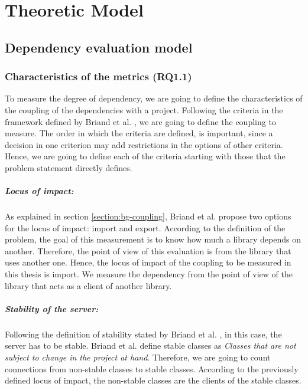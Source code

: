 \chapter{Theoretic Model}\label{ch:TheoreticModel}

\section{Dependency evaluation model}

\subsection{Characteristics of the metrics (RQ1.1)}
To measure the degree of dependency, we are going to define the characteristics of the coupling of the dependencies with a project. Following the criteria in the framework defined by Briand et al. \cite{briand1999unified}, we are going to define the coupling to measure. The order in which the criteria are defined, is important, since a decision in one criterion may add restrictions in the options of other criteria. Hence, we are going to define each of the criteria starting with those that the problem statement directly defines.

\paragraph{Locus of impact:}
As explained in section \ref{section:bg-coupling}, Briand et al. propose two options for the locus of impact: import and export. According to the definition of the problem, the goal of this measurement is to know how much a library depends on another. Therefore, the point of view of this evaluation is from the library that uses another one. Hence, the locus of impact of the coupling to be measured in this thesis is import. We measure the dependency from the point of view of the library that acts as a client of another library.

\paragraph{Stability of the server:}
Following the definition of stability stated by Briand et al. \cite{briand1999unified}, in this case, the server has to be stable. Briand et al. define stable classes as \textit{Classes that are not subject to change in the project at hand}. Therefore, we are going to count connections from non-stable classes to stable classes. According to the previously defined locus of impact, the non-stable classes are the clients of the stable classes.

